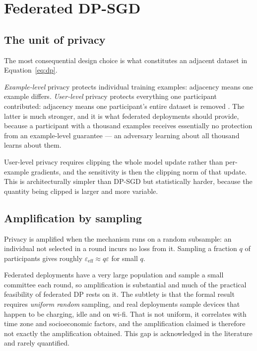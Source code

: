 \documentclass[11pt,a4paper]{article}
\begin{document}
\section{Federated DP-SGD}
\label{sec:fedsgd}

\subsection{The unit of privacy}

The most consequential design choice is what constitutes an adjacent dataset
in Equation~\ref{eq:dp}.

\emph{Example-level} privacy protects individual training examples: adjacency
means one example differs. \emph{User-level} privacy protects everything one
participant contributed: adjacency means one participant's entire dataset is
removed \cite{mcmahan2018}. The latter is much stronger, and it is what
federated deployments should provide, because a participant with a thousand
examples receives essentially no protection from an example-level guarantee
--- an adversary learning about all thousand learns about them.

User-level privacy requires clipping the whole model update rather than
per-example gradients, and the sensitivity is then the clipping norm of that
update. This is architecturally simpler than DP-SGD but statistically harder,
because the quantity being clipped is larger and more variable.

\subsection{Amplification by sampling}

Privacy is amplified when the mechanism runs on a random subsample: an
individual not selected in a round incurs no loss from it. Sampling a fraction
$q$ of participants gives roughly $\varepsilon_{\text{eff}} \approx q
\varepsilon$ for small $q$.

Federated deployments have a very large population and sample a small
committee each round, so amplification is substantial and much of the
practical feasibility of federated DP rests on it. The subtlety is that the
formal result requires \emph{uniform random} sampling, and real deployments
sample devices that happen to be charging, idle and on wi-fi. That is not
uniform, it correlates with time zone and socioeconomic factors, and the
amplification claimed is therefore not exactly the amplification obtained.
This gap is acknowledged in the literature \cite{kairouz2021} and rarely
quantified.
\end{document}
